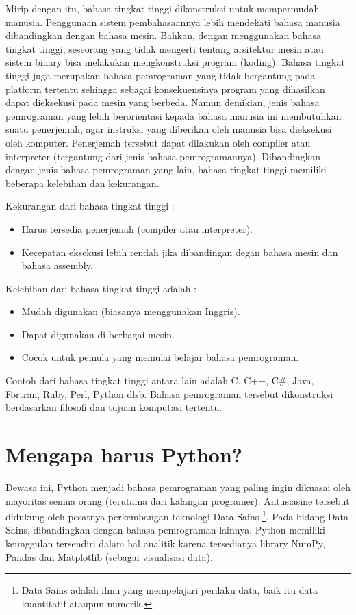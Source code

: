 Mirip dengan itu, bahasa tingkat tinggi dikonstruksi untuk mempermudah manusia. Penggunaan sistem pembahasaannya lebih mendekati bahasa manusia dibandingkan dengan bahasa mesin. Bahkan, dengan menggunakan bahasa tingkat tinggi, seseorang yang tidak mengerti tentang arsitektur mesin atau sistem binary bisa melakukan mengkonstruksi program (koding). Bahasa tingkat tinggi juga merupakan bahasa pemrograman yang tidak bergantung pada platform tertentu sehingga sebagai konsekuensinya program yang dihasilkan dapat dieksekusi pada mesin yang berbeda. Namun demikian, jenis bahasa pemrograman yang lebih berorientasi kepada bahasa manusia ini membutuhkan suatu penerjemah, agar instruksi yang diberikan oleh manusia bisa dieksekusi oleh komputer. Penerjemah tersebut dapat dilakukan oleh compiler atau interpreter (tergantung dari jenis bahasa pemrogramannya). Dibandingkan dengan jenis bahasa pemrograman yang lain, bahasa tingkat tinggi memiliki beberapa kelebihan dan kekurangan.

Kekurangan dari bahasa tingkat tinggi :
\begin{itemize}
	\item Harus tersedia penerjemah (compiler atau interpreter).
	\item Kecepatan eksekusi lebih rendah jika dibandingan degan bahasa mesin dan bahasa assembly.
\end{itemize}

Kelebihan dari bahasa tingkat tinggi adalah :
\begin{itemize}
	\item Mudah digunakan (biasanya menggunakan Inggris).
	\item Dapat digunakan di berbagai mesin.
	\item Cocok untuk pemula yang memulai belajar bahasa pemrograman.
\end{itemize}

Contoh dari bahasa tingkat tinggi antara lain adalah C, C++, C#, Java, Fortran, Ruby, Perl, Python dlsb. Bahasa pemrograman tersebut dikonstruksi berdasarkan filosofi dan tujuan komputasi tertentu.

\section{Mengapa harus Python?}
Dewasa ini, Python menjadi bahasa pemrograman yang paling ingin dikuasai oleh mayoritas semua orang (terutama dari kalangan programer). Antusiasme tersebut didukung oleh pesatnya perkembangan teknologi Data Sains \footnote{Data Sains adalah ilmu yang mempelajari perilaku data, baik itu data kuantitatif ataupun numerik.}. Pada bidang Data Sains, dibandingkan dengan bahasa pemrograman lainnya, Python memiliki keunggulan tersendiri dalam hal analitik karena tersedianya library NumPy, Pandas dan Matplotlib (sebagai visualisasi data).

